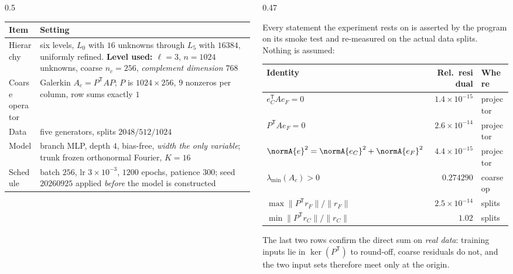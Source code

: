 \begin{columns}[T]
\begin{column}{0.5\textwidth}
{\scriptsize
\begin{tabular}{@{}p{2.6cm}p{9.6cm}@{}}
\toprule
Item & Setting \\
\midrule
Hierarchy & six levels, $L_0$ with $16$ unknowns through $L_5$ with $16384$, uniformly
refined. \textbf{Level used: $\ell=3$}, $n=1024$ unknowns, coarse $n_c=256$,
\emph{complement dimension $768$} \\[2pt]
Coarse operator & Galerkin $A_c=P^{\mathsf T}AP$; $P$ is $1024\times256$, $9$ nonzeros
per column, row sums exactly $1$ \\[2pt]
Data & five generators, splits $2048/512/1024$ \\[2pt]
Model & branch MLP, depth $4$, bias-free, \emph{width the only variable}; trunk frozen
orthonormal Fourier, $K=16$ \\[2pt]
Schedule & batch $256$, lr $3\times10^{-3}$, $1200$ epochs, patience $300$; seed
$20260925$ applied \emph{before} the model is constructed \\
\bottomrule
\end{tabular}}
\end{column}
\begin{column}{0.47\textwidth}
\raggedright
Every statement the experiment rests on is \alert{asserted by the program} on its smoke
test and re-measured on the actual data splits. Nothing is assumed:

\vspace{1mm}
{\scriptsize
\begin{tabular}{@{}p{4.4cm}rl@{}}
\toprule
Identity & Rel.\ residual & Where \\
\midrule
$e_C^{\mathsf T}Ae_F=0$ & $1.4\times10^{-15}$ & projector \\[1pt]
$P^{\mathsf T}Ae_F=0$ & $2.6\times10^{-14}$ & projector \\[1pt]
$\normA{e}^2=\normA{e_C}^2+\normA{e_F}^2$ & $4.4\times10^{-15}$ & projector \\[1pt]
$\lambda_{\min}(A_c)>0$ & $0.274290$ & coarse op \\[1pt]
$\max\|P^{\mathsf T}r_F\|/\|r_F\|$ & $2.5\times10^{-14}$ & splits \\[1pt]
$\min\|P^{\mathsf T}r_C\|/\|r_C\|$ & $1.02$ & splits \\
\bottomrule
\end{tabular}}

\vspace{1mm}
The last two rows confirm the direct sum on \emph{real data}: training inputs lie in
$\ker(P^{\mathsf T})$ to round-off, coarse residuals do not, and the two input sets
therefore meet only at the origin.
\end{column}
\end{columns}
